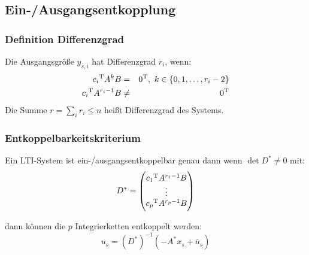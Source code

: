 \subsection{Ein-/Ausgangsentkopplung}
\subsubsection{Definition Differenzgrad}
Die Ausgangsgröße $y_{s,i}$ hat Differenzgrad $r_i$, wenn:
\begin{eqnarray}
    {c_i}^\text{T} A^k B &=& {0}^\text{T},\ k \in \{0, 1, \ldots, r_i-2\} \\ 
    {c_i}^\text{T} A^{r_i-1} B &\neq& {0}^\text{T}
\end{eqnarray}
Die Summe $r = \sum_i r_i \leq n$ heißt Differenzgrad des Systems.

\subsubsection{Entkoppelbarkeitskriterium}
Ein LTI-System ist ein-/ausgangsentkoppelbar genau dann wenn $\det D^* \neq 0$ mit:
\begin{equation}
    D^* = \begin{pmatrix}
            {c_1}^\text{T} A^{r_1-1} B \\
            \vdots \\
            {c_p}^\text{T} A^{r_p-1} B \\
        \end{pmatrix}
\end{equation}

dann können die $p$ Integrierketten entkoppelt werden:
\begin{equation}
    u_s = {(D^*)}^{-1} (-A^* x_s + \bar{u}_s)
\end{equation}

